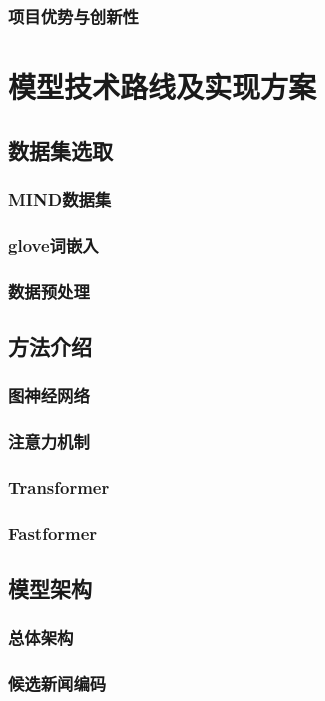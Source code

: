 \documentclass[withoutpreface,bwprint]{cumcmthesis} %
\begin{document}
	\subsubsection{ 项目优势与创新性}
	\newpage
	\section{模型技术路线及实现方案}
	\subsection{数据集选取}
	\subsubsection{ MIND数据集}
	\subsubsection{ glove词嵌入}
	\subsubsection{ 数据预处理}
	\subsection{方法介绍}
	\subsubsection{ 图神经网络}
	\subsubsection{ 注意力机制}
	\subsubsection{ Transformer}
	\subsubsection{ Fastformer}
	\subsection{模型架构}
	\subsubsection{ 总体架构}
	\subsubsection{ 候选新闻编码}
\end{document}
